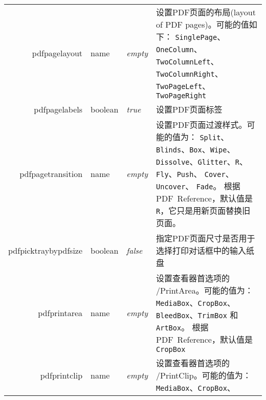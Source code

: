 \documentclass{article}
\begin{document}
\begin{longtable}{@{}>{\ttfamily}r>{\raggedright}p{}>{\itshape}lp{7cm}@{}}
    pdfpagelayout       & name           & empty                     & 设置PDF页面的布局(layout of PDF pages)。可能的值如下：
    \verb|SinglePage|、\verb|OneColumn|、
    \verb|TwoColumnLeft|、\verb|TwoColumnRight|、
    \verb|TwoPageLeft|、\verb|TwoPageRight|                                                                                                                                                                                                                                                          \\
    pdfpagelabels       & boolean        & true                      & 设置PDF页面标签                                                                                                                                                                                                                    \\
    pdfpagetransition   & name           & empty                     & 设置PDF页面过渡样式。可能的值为：
    \verb|Split|、\verb|Blinds|、\verb|Box|、\verb|Wipe|、
    \verb|Dissolve|、\verb|Glitter|、\verb|R|、
    \verb|Fly|、\verb|Push|、
    \verb|Cover|、\verb|Uncover|、
    \verb|Fade|。
    根据PDF~Reference，默认值是 \verb|R|，它只是用新页面替换旧页面。                                                                                                                                                                                                                                                     \\
    pdfpicktraybypdfsize
                        & boolean        & false                     & 指定PDF页面尺寸是否用于选择打印对话框中的输入纸盘                                                                                                                                                                                                   \\
    pdfprintarea        & name           & empty                     & 设置查看器首选项的 /PrintArea。可能的值为：
    \verb|MediaBox|、\verb|CropBox|、
    \verb|BleedBox|、\verb|TrimBox| 和 \verb|ArtBox|。
    根据PDF~Reference，默认值是 \verb|CropBox|                                                                                                                                                                                                                                                             \\
    pdfprintclip        & name           & empty                     & 设置查看器首选项的 /PrintClip。可能的值为：
    \verb|MediaBox|、\verb|CropBox|、

\end{longtable}
\end{document}
